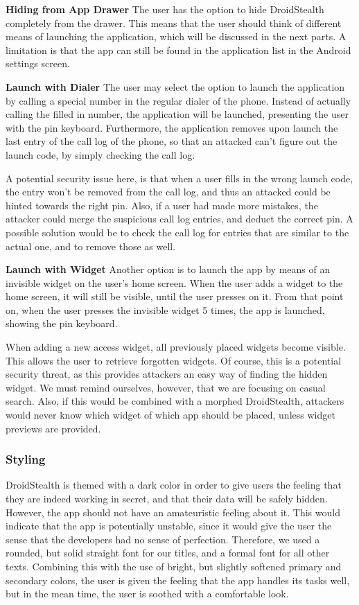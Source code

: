 \textbf{Hiding from App Drawer}
The user has the option to hide DroidStealth completely from the drawer. This 
means that the user should think of different means of launching the application, 
which will be discussed in the next parts. A limitation is that the app can still be found
in the application list in the Android settings screen. 

\textbf{Launch with Dialer}
The user may select the option to launch the application by calling a special number
in the regular dialer of the phone. Instead of actually calling the filled in number, the
application will be launched, presenting the user with the pin keyboard. Furthermore,
the application removes upon launch the last entry of the call log of the phone, so that
an attacked can't figure out the launch code, by simply checking the call log.

A potential security issue here, is that when a user fills in the wrong launch code, the 
entry won't be removed from the call log, and thus an attacked could be hinted towards
the right pin. Also, if a user had made more mistakes, the attacker could merge the 
suspicious call log entries, and deduct the correct pin. A possible solution would be to
check the call log for entries that are similar to the actual one, and to remove those as well.

\textbf{Launch with Widget}
Another option is to launch the app by means of an invisible widget on the user's home screen. 
When the user adds a widget to the home screen, it will still be visible, until the user presses on it. 
From that point on, when the user presses the invisible widget 5 times, the app is launched, showing the pin keyboard.

When adding a new access widget, all previously placed widgets become visible. This allows 
the user to retrieve forgotten widgets. Of course, this is a potential security threat, as this 
provides attackers an easy way of finding the hidden widget. We must remind ourselves, 
however, that we are focusing on casual search. Also, if this would be combined with
a morphed DroidStealth, attackers would never know which widget of which app should be
placed, unless widget previews are provided.

\subsubsection{Styling}

DroidStealth is themed with a dark color in order to give users the feeling that they are indeed
working in secret, and that their data will be safely hidden. However, the app should not
have an amateuristic feeling about it. This would indicate that the app is potentially unstable, 
since it would give the user the sense that the developers had no sense of perfection. 
Therefore, we used a rounded, but solid straight font for our titles, and a formal font for 
all other texts. Combining this with the use of bright, but slightly softened primary and 
secondary colors, the user is given the feeling that the app handles its tasks well, but in 
the mean time, the user is soothed with a comfortable look. %

